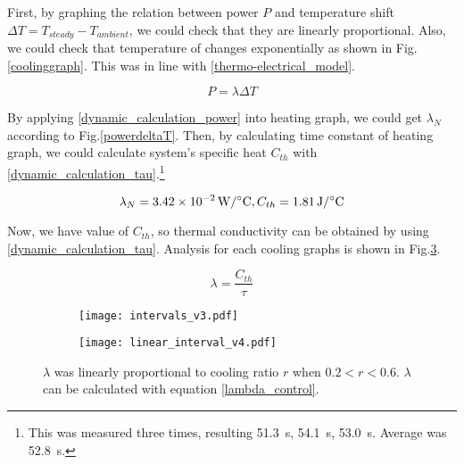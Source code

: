 First, by graphing the relation between power $P$ and temperature shift $\Delta{T}=T_{steady}-T_{ambient}$, we could check that they are linearly proportional.
Also, we could check that temperature of \scp changes exponentially as shown in Fig.\ref{coolinggraph}. This was in line with  \eqref{thermo-electrical_model}.

\begin{equation} \label{dynamic_calculation_power}
P = \lambda\Delta{T}
\end{equation}

By applying \eqref{dynamic_calculation_power} into heating graph, we could get $\lambda_{N}$ according to Fig.\ref{powerdeltaT}. Then, by calculating time constant of heating graph, we could calculate \scp system's specific heat $C_{th}$ with \eqref{dynamic_calculation_tau}.\footnote{This was measured three times, resulting \SI{51.3}{\second}, \SI{54.1}{\second}, \SI{53.0}{\second}. Average was \SI{52.8}{\second}.} 

\begin{equation}
\lambda_{N}=\SI{3.42e-2}{\watt\per\degreeCelsius}, C_{th}=\SI{1.81}{\joule\per\degreeCelsius} \notag
\end{equation}


Now, we have value of $C_{th}$, so thermal conductivity can be obtained by using \eqref{dynamic_calculation_tau}. Analysis for each cooling graphs is shown in Fig.\ref{analysis_dynamic}.

\begin{equation} \label{dynamic_calculation_tau}
\lambda = \frac{C_{th}}{\tau}
\end{equation}

\begin{figure}[t]
	\begin{subfigure}[t]{0.52\linewidth}
		\centering\texttt{[image: intervals\_v3.pdf]}
		\caption{\label{dynamic_proportional}}
	\end{subfigure}%
	\begin{subfigure}[t]{0.39\linewidth}
		\centering\texttt{[image: linear\_interval\_v4.pdf]}
		\caption{\label{linear_interval}}
	\end{subfigure}
	\caption[Analysis of dynamic experiment]{ $\lambda$ was linearly proportional to cooling ratio $r$ when $0.2<r<0.6$.   $\lambda$ can be calculated with equation \eqref{lambda_control}.}
	\label{analysis_dynamic}
\end{figure}

